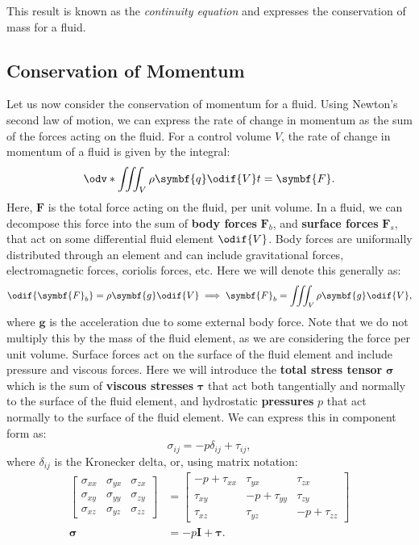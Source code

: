 \documentclass{article}
\theoremstyle{definition}
\begin{document}
This result is known as the \textit{continuity equation} and expresses
the conservation of mass for a fluid.
\subsection{Conservation of Momentum}
Let us now consider the conservation of momentum for a fluid. Using
Newton's second law of motion, we can express the rate of change in
momentum as the sum of the forces acting on the fluid. For a control
volume \(V\), the rate of change in momentum of a fluid is given by the
integral:
\begin{equation*}
    \odv*{\iiint_V \rho \symbf{q} \odif{V}}{t} = \symbf{F}.
\end{equation*}
Here, \(\symbf{F}\) is the total force acting on the fluid, per unit
volume. In a fluid, we can decompose this force into the sum of
\textbf{body forces} \(\symbf{F}_b\), and \textbf{surface forces}
\(\symbf{F}_s\), that act on some differential fluid element \(\odif{V}\).
Body forces are uniformally distributed through an element and can
include gravitational forces, electromagnetic forces, coriolis forces,
etc. Here we will denote this generally as:
\begin{equation*}
    \odif{\symbf{F}_b} = \rho \symbf{g} \odif{V} \implies \symbf{F}_b = \iiint_V \rho \symbf{g} \odif{V},
\end{equation*}
where \(\symbf{g}\) is the acceleration due to some external body force.
Note that we do not multiply this by the mass of the fluid element, as
we are considering the force per unit volume. Surface forces act on the
surface of the fluid element and include pressure and viscous forces.
Here we will introduce the \textbf{total stress tensor} \(\symbf{\sigma}\)
which is the sum of \textbf{viscous stresses} \(\symbf{\tau}\) that
act both tangentially and normally to the surface of the fluid element,
and hydrostatic \textbf{pressures} \(p\) that act normally to the
surface of the fluid element. We can express this in component form as:
\begin{equation*}
    \sigma_{ij} = -p \delta_{ij} + \tau_{ij},
\end{equation*}
where \(\delta_{ij}\) is the Kronecker delta, or, using matrix notation:
\begin{align*}
    \begin{bmatrix}
        \sigma_{xx} & \sigma_{yx} & \sigma_{zx} \\
        \sigma_{xy} & \sigma_{yy} & \sigma_{zy} \\
        \sigma_{xz} & \sigma_{yz} & \sigma_{zz}
    \end{bmatrix}
                   & =
    \begin{bmatrix}
        -p + \tau_{xx} & \tau_{yx}      & \tau_{zx}      \\
        \tau_{xy}      & -p + \tau_{yy} & \tau_{zy}      \\
        \tau_{xz}      & \tau_{yz}      & -p + \tau_{zz}
    \end{bmatrix}
    \\
    \symbf{\sigma} & = -p \symbf{I} + \symbf{\tau}.
\end{align*}
\end{document}
